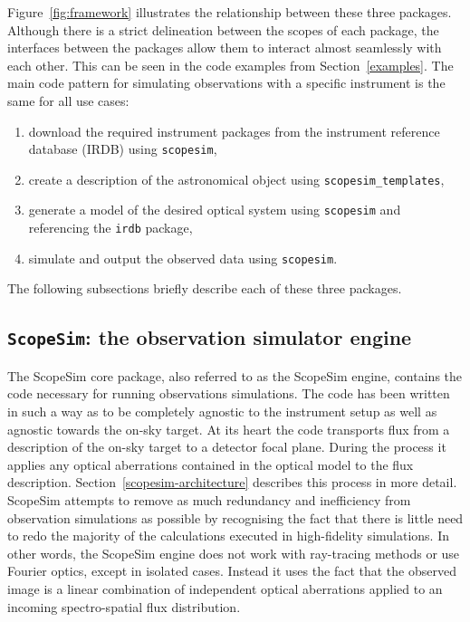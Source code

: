 Figure~\ref{fig:framework} illustrates the relationship between these three packages.
Although there is a strict delineation between the scopes of each package, the interfaces between the packages allow them to interact almost seamlessly with each other.
This can be seen in the code examples from Section~\ref{examples}.
The main code pattern for simulating observations with a specific instrument is the same for all use cases:

\begin{enumerate}
\item download the required instrument packages from the instrument reference database (IRDB) using \lstinline{scopesim},

\item create a description of the astronomical object using \lstinline{scopesim_templates},

\item generate a model of the desired optical system using \lstinline{scopesim} and referencing the \lstinline{irdb} package,

\item simulate and output the observed data using \lstinline{scopesim}.
\end{enumerate}

The following subsections briefly describe each of these three packages.

\subsection{\lstinline{ScopeSim}: the observation simulator engine}
\label{scopesim-the-observation-simulator-engine}

The ScopeSim core package, also referred to as the ScopeSim engine, contains the code necessary for running observations simulations.
The code has been written in such a way as to be completely agnostic to the instrument setup as well as agnostic towards the on-sky target.
At its heart the code transports flux from a description of the on-sky target to a detector focal plane.
During the process it applies any optical aberrations contained in the optical model to the flux description.
Section~\ref{scopesim-architecture} describes this process in more detail.
ScopeSim attempts to remove as much redundancy and inefficiency from observation simulations as possible by recognising the fact that there is little need to redo the majority of the calculations executed in high-fidelity simulations.
In other words, the ScopeSim engine does not work with ray-tracing methods or use Fourier optics, except in isolated cases.
Instead it uses the fact that the observed image is a linear combination of independent optical aberrations applied to an incoming spectro-spatial flux distribution.


